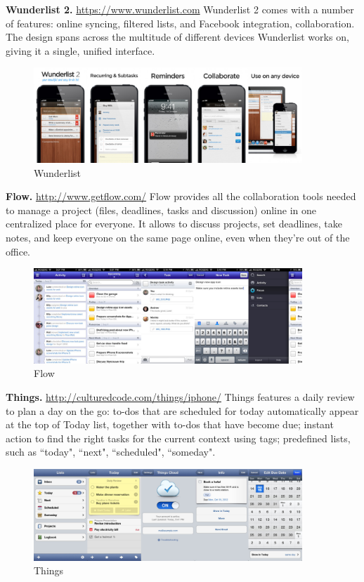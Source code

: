 \textbf{Wunderlist 2.} \url{https://www.wunderlist.com} Wunderlist 2 comes with a number of features: online syncing, filtered lists, and Facebook integration, collaboration. The design spans across the multitude of different devices Wunderlist works on, giving it a single, unified interface.

\begin{figure}
   \centering
	\includegraphics[width=0.9\textwidth]{resources/wunderlist.pdf}
	\caption[Wunderlist]{Wunderlist}
\end{figure}

\textbf{Flow.} \url{http://www.getflow.com/} Flow provides all the collaboration tools needed to manage a project (files, deadlines, tasks and discussion) online in one centralized place for everyone. It allows to discuss projects, set deadlines, take notes, and keep everyone on the same page online, even when they're out of the office.

\begin{figure}
   \centering
	\includegraphics[width=0.9\textwidth]{resources/flow.pdf}
	\caption[Flow]{Flow}
\end{figure}

\textbf{Things.} \url{http://culturedcode.com/things/iphone/} Things features a daily review to plan a day on the go: to-dos that are scheduled for today automatically appear at the top of Today list, together with to-dos that have become due; instant action to find the right tasks for the current context using tags; predefined lists, such as ``today", ``next", ``scheduled", ``someday".

\begin{figure}
   \centering
	\includegraphics[width=0.9\textwidth]{resources/things.pdf}
	\caption[Things]{Things}
\end{figure}

